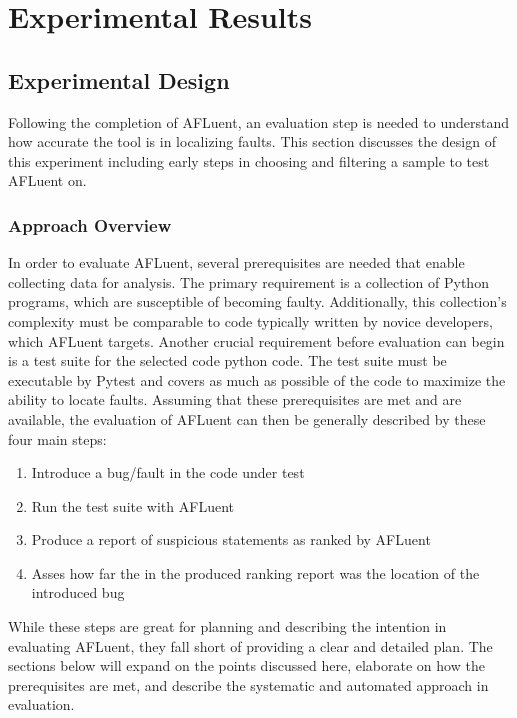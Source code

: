 \chapter{Experimental Results}
\label{ch:experiments}

\section{Experimental Design}
\label{sec:expiremental_design}

Following the completion of AFLuent, an evaluation step is needed to understand
how accurate the tool is in localizing faults. This section discusses the design
of this experiment including early steps in choosing and filtering a sample to
test AFLuent on.

\subsection{Approach Overview}
\label{subsec:approach_overview}

In order to evaluate AFLuent, several prerequisites are needed that enable
collecting data for analysis. The primary requirement is a collection of Python
programs, which are susceptible of becoming faulty. Additionally, this
collection's complexity must be comparable to code typically written by novice
developers, which AFLuent targets. Another crucial requirement before evaluation
can begin is a test suite for the selected code python code. The test suite must
be executable by Pytest and covers as much as possible of the code to
maximize the ability to locate faults. Assuming that these prerequisites are
met and are available, the evaluation of AFLuent can then be generally described
by these four main steps:

\begin{enumerate}
    \item Introduce a bug/fault in the code under test
    \item Run the test suite with AFLuent
    \item Produce a report of suspicious statements as ranked by AFLuent
    \item Asses how far the in the produced ranking report was the location of
    the introduced bug
\end{enumerate}

While these steps are great for planning and describing the intention in evaluating
AFLuent, they fall short of providing a clear and detailed plan. The sections
below will expand on the points discussed here, elaborate on how the
prerequisites are met, and describe the systematic and automated approach in evaluation.


